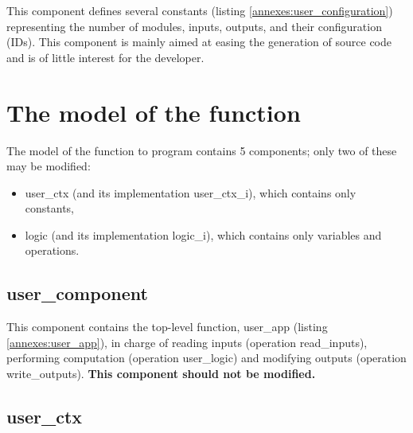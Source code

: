This component defines several constants (listing \ref{annexes:user_configuration}) representing the number of modules, inputs, outputs, and their configuration (IDs). This component is mainly aimed at easing the generation of source code and is of little interest for the developer. 



\section{The model of the function}

The model of the function to program contains 5 components; only two of these may be modified: 
\begin{itemize}
    \item user\_ctx (and its implementation user\_ctx\_i), which contains only constants,
    \item logic (and its implementation logic\_i), which contains only variables and operations.
\end{itemize}

\subsection{user\_component}

This component contains the top-level function, user\_app (listing \ref{annexes:user_app}), in charge of reading inputs (operation read\_inputs), performing computation (operation user\_logic) and modifying outputs (operation write\_outputs). \textbf{\color{ocre}This component should not be modified.} 


\subsection{user\_ctx}

